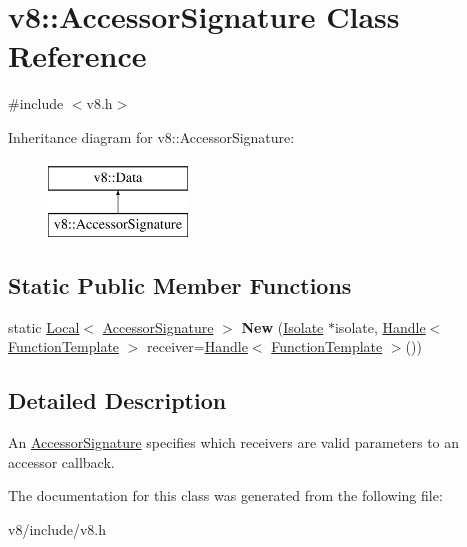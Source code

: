 \hypertarget{classv8_1_1AccessorSignature}{\section{v8\-:\-:Accessor\-Signature Class Reference}
\label{classv8_1_1AccessorSignature}
}


{\ttfamily \#include $<$v8.\-h$>$}

Inheritance diagram for v8\-:\-:Accessor\-Signature\-:\begin{figure}[H]
\begin{center}
\leavevmode
\includegraphics[height=2.000000cm]{classv8_1_1AccessorSignature}
\end{center}
\end{figure}
\subsection*{Static Public Member Functions}
\begin{DoxyCompactItemize}
\item 
\hypertarget{classv8_1_1AccessorSignature_a608c489295009cf8c343c1099559b1cf}{static \hyperlink{classv8_1_1Local}{Local}$<$ \hyperlink{classv8_1_1AccessorSignature}{Accessor\-Signature} $>$ {\bfseries New} (\hyperlink{classv8_1_1Isolate}{Isolate} $\ast$isolate, \hyperlink{classv8_1_1Handle}{Handle}$<$ \hyperlink{classv8_1_1FunctionTemplate}{Function\-Template} $>$ receiver=\hyperlink{classv8_1_1Handle}{Handle}$<$ \hyperlink{classv8_1_1FunctionTemplate}{Function\-Template} $>$())}\label{classv8_1_1AccessorSignature_a608c489295009cf8c343c1099559b1cf}

\end{DoxyCompactItemize}


\subsection{Detailed Description}
An \hyperlink{classv8_1_1AccessorSignature}{Accessor\-Signature} specifies which receivers are valid parameters to an accessor callback. 

The documentation for this class was generated from the following file\-:\begin{DoxyCompactItemize}
\item 
v8/include/v8.\-h\end{DoxyCompactItemize}
